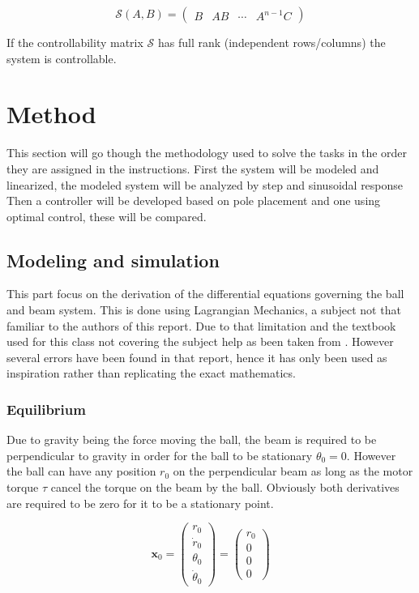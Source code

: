 \documentclass[a4paper, titlepage]{article}
\begin{document}
\begin{equation}
\mathcal{S}(A,B) = 
\begin{pmatrix}
B & AB & \cdots & A^{n-1}C
\end{pmatrix}
\label{equ:ctrb}
\end{equation}

If the controllability matrix $\mathcal{S}$ has full rank (independent rows/columns) the system is controllable.

\section{Method}
This section will go though the methodology used to solve the tasks in the order they are assigned in the instructions.
First the system will be modeled and linearized, the modeled system will be analyzed by step and sinusoidal response
Then a controller will be developed based on pole placement and one using optimal control, these will be compared.

\subsection{Modeling and simulation}
This part focus on the derivation of the differential equations governing the ball and beam system.
This is done using Lagrangian Mechanics, a subject not that familiar to the authors of this report.
Due to that limitation and the textbook used for this class not covering the subject help as been taken from \citep{BolvarVincenty2014ModellingTB}.
However several errors have been found in that report, hence it has only been used as inspiration rather than replicating the exact mathematics.

\subsubsection{Equilibrium}
Due to gravity being the force moving the ball, the beam is required to be perpendicular to gravity in order for the ball to be stationary $\theta_0 = 0$.
However the ball can have any position $r_0$ on the perpendicular beam as long as the motor torque $\tau$ cancel the torque on the beam by the ball.
Obviously both derivatives are required to be zero for it to be a stationary point.

\begin{equation}
\textbf{x}_0 = 
\begin{pmatrix}
r_0 \\ \dot{r}_0 \\ \theta_0 \\ \dot{\theta}_0
\end{pmatrix} = 
\begin{pmatrix}
r_0 \\ 0 \\ 0 \\ 0
\end{pmatrix}
\label{equ:stateEqulibrium}
\end{equation}
\end{document}

